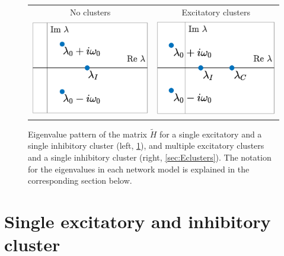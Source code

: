 \documentclass[reqno]{siamonline190516}
\begin{document}
\begin{figure}
    \centering
    \begin{tabular}{cc}
    No clusters &
    Excitatory clusters \\
    \includegraphics[width=6cm]{eigpattern1.eps} &
    \includegraphics[width=6cm]{eigpattern2.eps}
    \end{tabular}
    \caption{Eigenvalue pattern of the matrix $\tilde{H}$ for a single excitatory and a single inhibitory cluster (left, \cref{sec:E1I1}), and multiple excitatory clusters and a single inhibitory cluster (right, \cref{sec:Eclusters}). The notation for the eigenvalues in each network model is explained in the corresponding section below.}
    \label{fig:Heigpattern}
\end{figure}

 
\section{Single excitatory and inhibitory cluster}\label{sec:E1I1}
\end{document}
